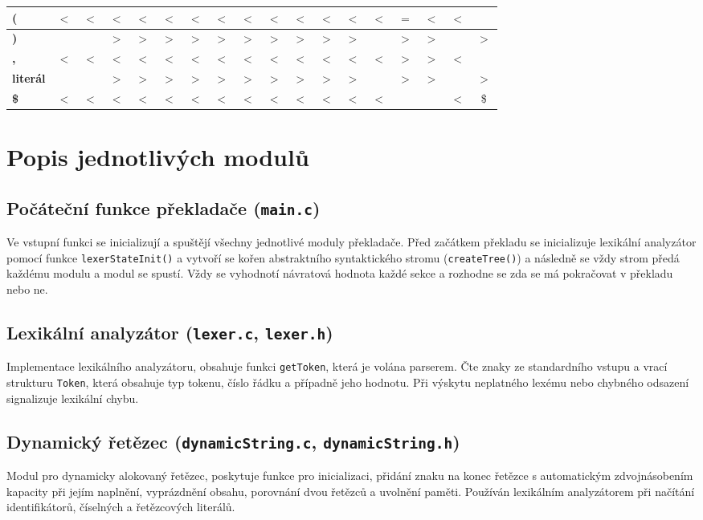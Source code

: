 \documentclass[12pt, a4paper]{article}
\begin{document}
\begin{table}[!htbp]
{\begin{tabular}{|l|*{17}{c|}}
      \textbf{(}       & $<$ & $<$ & $<$ & $<$ & $<$ & $<$ & $<$ & $<$ & $<$ & $<$ & $<$ & $<$ & $<$ & $=$ & $<$ & $<$ &     \\ \hline
      \textbf{)}       &     &     & $>$ & $>$ & $>$ & $>$ & $>$ & $>$ & $>$ & $>$ & $>$ & $>$ &     & $>$ & $>$ &     & $>$ \\ \hline
      \textbf{,}       & $<$ & $<$ & $<$ & $<$ & $<$ & $<$ & $<$ & $<$ & $<$ & $<$ & $<$ & $<$ & $<$ & $>$ & $>$ & $<$ &     \\ \hline
      \textbf{literál} &     &     & $>$ & $>$ & $>$ & $>$ & $>$ & $>$ & $>$ & $>$ & $>$ & $>$ &     & $>$ & $>$ &     & $>$ \\ \hline
      \textbf{\$}      & $<$ & $<$ & $<$ & $<$ & $<$ & $<$ & $<$ & $<$ & $<$ & $<$ & $<$ & $<$ & $<$ &     &     & $<$ & \$  \\ \hline
    \end{tabular}%
  }
\end{table}
\section{Popis jednotlivých modulů}
\subsection{Počáteční funkce překladače (\texttt{main.c})} Ve vstupní funkci se inicializují a spuštějí všechny jednotlivé moduly překladače. Před začátkem překladu se inicializuje lexikální analyzátor pomocí funkce \texttt{lexerStateInit()} a vytvoří se kořen abstraktního syntaktického stromu (\texttt{createTree()}) a následně se vždy strom předá každému modulu a modul se spustí. Vždy se vyhodnotí návratová hodnota každé sekce a rozhodne se zda se má pokračovat v překladu nebo ne.

\subsection{Lexikální analyzátor (\texttt{lexer.c}, \texttt{lexer.h})}
Implementace lexikálního analyzátoru, obsahuje funkci \texttt{getToken}, která je volána parserem. Čte znaky ze standardního vstupu a vrací strukturu \texttt{Token}, která obsahuje typ tokenu, číslo řádku a případně jeho hodnotu. Při výskytu neplatného lexému nebo chybného odsazení signalizuje lexikální chybu.

\subsection{Dynamický řetězec (\texttt{dynamicString.c}, \texttt{dynamicString.h})}
Modul pro dynamicky alokovaný řetězec, poskytuje funkce pro inicializaci, přidání znaku na konec řetězce s automatickým zdvojnásobením kapacity při jejím naplnění, vyprázdnění obsahu, porovnání dvou řetězců a uvolnění paměti. Používán lexikálním analyzátorem při načítání identifikátorů, číselných a řetězcových literálů.
\end{document}
